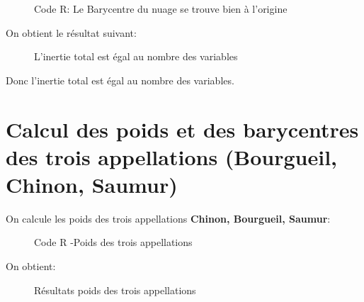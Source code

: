 \begin{figure}[h]
\centering
{}
\caption{Code R: Le Barycentre du nuage se trouve bien à l'origine}
\end{figure}

\newpage

On obtient le résultat suivant:

\begin{figure}[h]
\centering
{}
\caption{L'inertie total est égal au nombre des variables}
\end{figure}

Donc l'inertie total est égal au nombre des variables.

\section{Calcul des poids et des barycentres des trois appellations (Bourgueil, Chinon, Saumur)}

On calcule les poids des trois appellations \textbf{Chinon, Bourgueil, Saumur}:

\begin{figure}[h]
\centering
{}
\caption{Code R -Poids des trois appellations}
\end{figure}

On obtient:

\begin{figure}[h]
\centering
{}
\caption{Résultats poids des trois appellations}
\end{figure}


